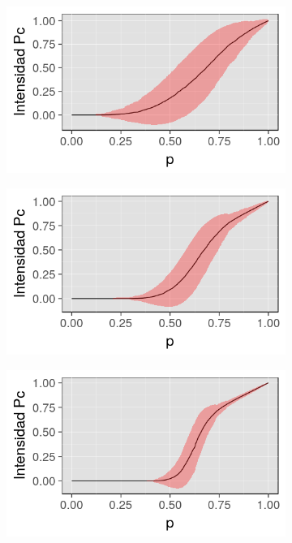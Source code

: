 \documentclass[%
 reprint,
 amsmath,amssymb,
 aps,
spanish]{revtex4-1}
\begin{document}
\begin{figure}[h]
\begin{subfigure}{.25\textwidth}
  \centering
  \includegraphics[width=.9\linewidth]{ej2/4x4}
  \label{fig:24x4}
\end{subfigure}%
\begin{subfigure}{.25\textwidth}
  \centering
  \includegraphics[width=.9\linewidth]{ej2/8x8}
  \label{fig:28x8}
\end{subfigure}
\begin{subfigure}{.25\textwidth}
  \centering
  \includegraphics[width=.9\linewidth]{ej2/16x16}

\end{subfigure}
\end{figure}
\end{document}
